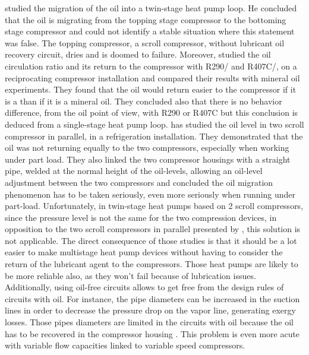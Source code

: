 \citet{Zehnder-2004a} studied the migration of the oil into a
twin-stage heat pump loop. He concluded that the oil is migrating from
the topping stage compressor to the bottoming stage compressor and
could not identify a stable situation where this statement was
false. The topping compressor, a scroll compressor, without lubricant
oil recovery circuit, dries and is doomed to failure. Moreover,
\citet{Navarro-Corberan-2005a} studied the oil circulation ratio and
its return to the compressor with R290/\POE{} and R407C/\POE{}, on a
reciprocating compressor installation and compared their results with
mineral oil experiments. They found that the oil would return easier
to the compressor if it is a \POE{} than if it is a mineral oil. They
concluded also that there is no behavior difference, from the oil
point of view, with R290 or R407C but this conclusion is deduced from
a single-stage heat pump loop. \citet{Winandy-Cuevas-2003a} has
studied the oil level in two scroll compressor in parallel, in a
refrigeration installation. They demonstrated that the oil was not
returning equally to the two compressors, especially when working
under part load. They also linked the two compressor housings with a
straight pipe, welded at the normal height of the oil-levels, allowing
an oil-level adjustment between the two compressors and concluded the
oil migration phenomenon has to be taken seriously, even more
seriously when running under part-load. Unfortunately, in twin-stage
heat pumps based on 2 scroll compressors, since the pressure level is
not the same for the two compression devices, in opposition to the two
scroll compressors in parallel presented by
\citet{Winandy-Cuevas-2003a}, this solution is not applicable. The
direct consequence of those studies is that it should be a lot easier
to make multistage heat pump devices without having to consider the
return of the lubricant agent to the compressors. Those heat pumps are
likely to be more reliable also, as they won't fail because of
lubrication issues. Additionally, using oil-free circuits allows to
get free from the design rules of circuits with oil. For instance, the
pipe diameters can be increased in the suction lines in order to
decrease the pressure drop on the vapor line, generating exergy
losses. Those pipes diameters are limited
in the circuits with oil because the oil has to be recovered in the
compressor housing \citep{kesim-ileri-2000a,Guo-Shen-2011a}. This
problem is even more acute with variable flow capacities linked to
variable speed compressors.

